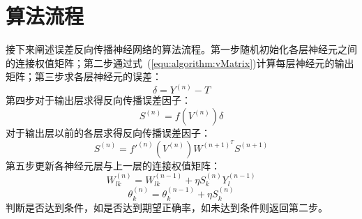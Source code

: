 \section{算法流程}
接下来阐述误差反向传播神经网络的算法流程。第一步随机初始化各层神经元之间的连接权值矩阵；第二步通过式~(\ref{equ:algorithm:vMatrix})计算每层神经元的输出矩阵；第三步求各层神经元的误差：
\begin{equation}
\delta =Y^{(n)}-T
\end{equation}
第四步对于输出层求得反向传播误差因子：
\begin{equation}
S^{(n)}=f(V^{(n)})\delta
\end{equation}
对于输出层以前的各层求得反向传播误差因子：
\begin{equation}
S^{(n)}=f'^{(n)}(V^{(n)})W^{(n+1)^T}S^{(n+1)}
\end{equation}
第五步更新各神经元层与上一层的连接权值矩阵：
\begin{equation}
W_{lk}^{(n)}=W_{lk}^{(n-1)}+\eta S_k^{(n)}Y_l^{(n-1)}
\end{equation}
\begin{equation}
\theta_k^{(n)}=\theta_k^{(n-1)}+\eta S_k^{(n)}
\end{equation}
判断是否达到条件，如是否达到期望正确率，如未达到条件则返回第二步。

